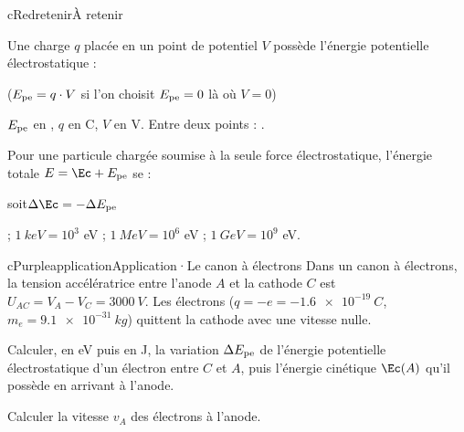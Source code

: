 \begin{rub}[colback=cRed!4!white, boxrule=1.4pt, unbreakable]{cRed}{retenir}{À retenir}
\ifeleve\RaggedRight\fi
{}\par\smallskip
Une charge $q$ placée en un point de potentiel $V$ possède l’énergie potentielle électrostatique :
\begin{center}\qquad ($E_{\mathrm{pe}} = q\cdot V$ si l’on choisit $E_{\mathrm{pe}} = 0$ là où $V = 0$)\end{center}
$E_{\mathrm{pe}}$ en , $q$ en C, $V$ en V. Entre deux points : .\par\medskip
{}\par\smallskip
Pour une particule chargée soumise à la seule force électrostatique, l’énergie totale $E = \Ec + \Epe$ se  :
\begin{center}\qquad soit\quad $\Delta\Ec = -\Delta\Epe$\end{center}
\par\smallskip
{} ; $\qty{1}{keV} = 10^3$ eV ; $\qty{1}{MeV} = 10^6$ eV ; $\qty{1}{GeV} = 10^9$ eV.
\end{rub}

\begin{rub}[unbreakable]{cPurple}{application}{Application\enspace·\enspace Le canon à électrons}
Dans un canon à électrons, la tension accélératrice entre l’anode $A$ et la cathode $C$ est $U_{AC} = V_A - V_C = \qty{3000}{V}$. Les électrons ($q = -e = \qty{-1,6e-19}{C}$, $m_e = \qty{9,1e-31}{kg}$) quittent la cathode avec une vitesse nulle.
\begin{appq}
  \item Calculer, en eV puis en J, la variation $\Delta E_{\mathrm{pe}}$ de l’énergie potentielle électrostatique d’un électron entre $C$ et $A$, puis l’énergie cinétique $\Ec(A)$ qu’il possède en arrivant à l’anode.
  \item Calculer la vitesse $v_A$ des électrons à l’anode.
\end{appq}
\end{rub}

